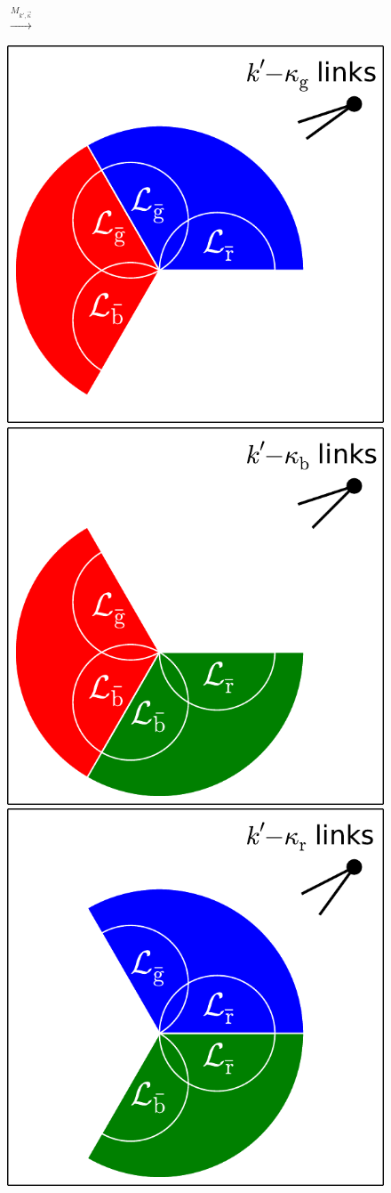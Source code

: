 \documentclass[aps, pre, onecolumn, a4paper, floatfix]{revtex4}
\begin{document}
\begin{figure}[htb]
\begin{minipage}[b]{0.22\linewidth}
  \end{minipage}
  \begin{minipage}[b]{0.1\linewidth}
    \begin{center}
      {\Large $\xrightarrow{M_{k',\vec{\kappa}}}$}\\
      \vspace{20mm}
    \end{center}
  \end{minipage}
  \begin{minipage}[b]{0.54\linewidth}
    \begin{center}
    \includegraphics[height=0.4\columnwidth]{sets_k_no_2_gc.pdf}
     \hspace{-1mm}
    \includegraphics[trim=100 0 0 0,clip,height=0.4\columnwidth]{sets_k_no_3_gc.pdf}
     \hspace{-1mm}
    \includegraphics[trim=100 0 0 0,clip,height=0.4\columnwidth]{sets_k_no_1_gc.pdf}
   \end{center}

\end{minipage}
\end{figure}
\end{document}
